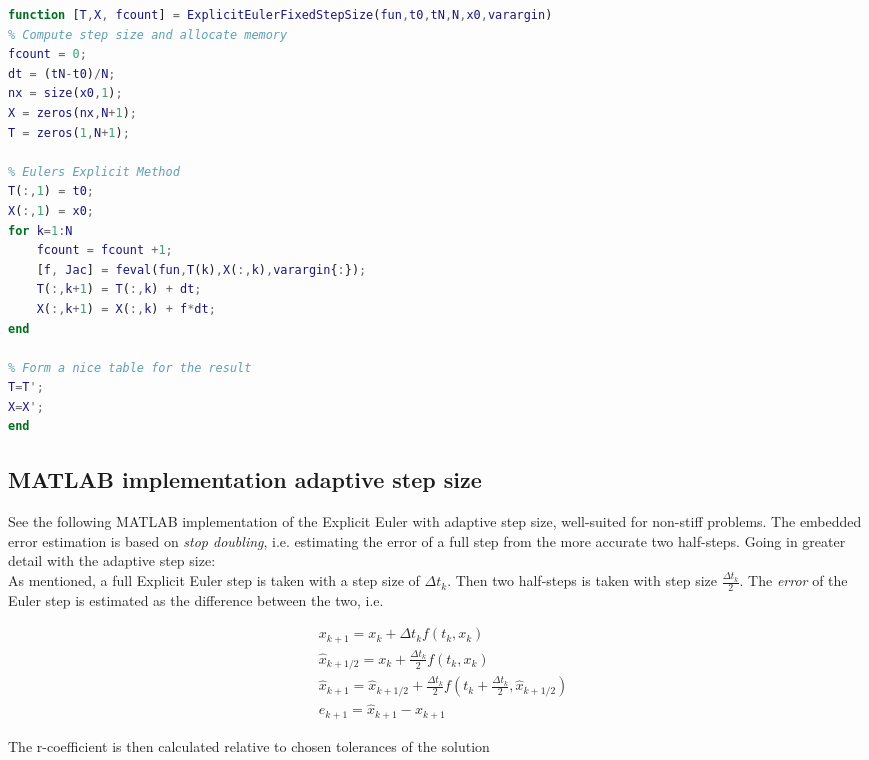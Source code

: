 \begin{adjustwidth*}{0cm}{-0.4cm}
\begin{lstlisting}[frame=single, language=Matlab,caption=Explicit Euler (fixed step size), label=ExplicitEulerFixie]
function [T,X, fcount] = ExplicitEulerFixedStepSize(fun,t0,tN,N,x0,varargin)
% Compute step size and allocate memory
fcount = 0;
dt = (tN-t0)/N;
nx = size(x0,1);
X = zeros(nx,N+1);
T = zeros(1,N+1);

% Eulers Explicit Method
T(:,1) = t0;
X(:,1) = x0;
for k=1:N
    fcount = fcount +1;
    [f, Jac] = feval(fun,T(k),X(:,k),varargin{:});
    T(:,k+1) = T(:,k) + dt;
    X(:,k+1) = X(:,k) + f*dt;
end

% Form a nice table for the result
T=T';
X=X';
end
\end{lstlisting}
\end{adjustwidth*}

\subsection{MATLAB implementation adaptive step size}
\label{sec:ExplicitEulerAdaptive} \label{sec:stepdoubling}
See the following MATLAB implementation of the Explicit Euler with adaptive step size, well-suited for non-stiff problems. The embedded error estimation is based on \textit{stop doubling}, i.e. estimating the error of a full step from the more accurate two half-steps. Going in greater detail with the adaptive step size:\\

As mentioned, a full Explicit Euler step is taken with a step size of $\Delta {t_k}$. Then two half-steps is taken with step size $\frac{\Delta t_k}{2}$. The \textit{error} of the Euler step is estimated as the difference between the two, i.e. 

\begin{equation}
\begin{aligned}
&x_{k+1}=x_{k}+\Delta t_k f\left(t_{k}, x_{k}\right) \\
&\hat{x}_{k+1 / 2}=x_{k}+\frac{\Delta t_k}{2} f\left(t_{k}, x_{k}\right) \\
&\hat{x}_{k+1}=\hat{x}_{k+1 / 2}+\frac{\Delta t_k}{2} f\left(t_{k}+\frac{\Delta t_k}{2}, \hat{x}_{k+1 / 2}\right) \\
&e_{k+1}=\hat{x}_{k+1}-x_{k+1}
\end{aligned}
\end{equation}

The r-coefficient is then calculated relative to chosen tolerances of the solution

